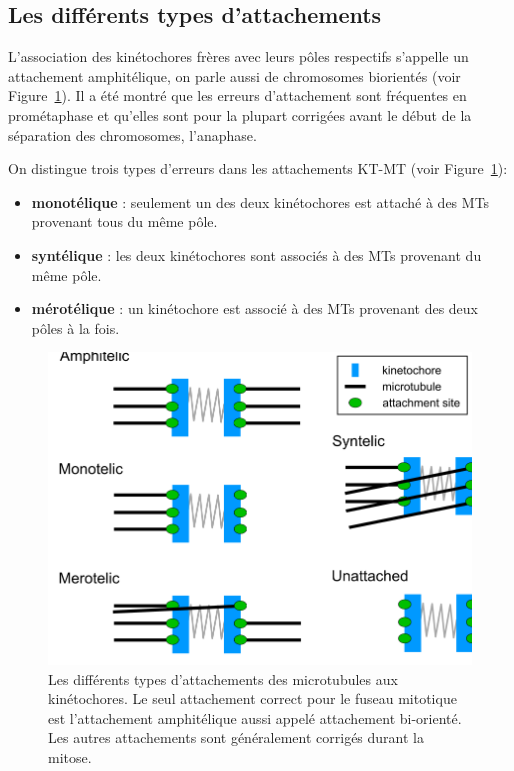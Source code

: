 \documentclass[12pt,a4paper,twoside,openright]{book}
\begin{document}
\subsection{Les différents types
d'attachements}\label{sec:attachments-type}

L'association des kinétochores frères avec leurs pôles respectifs
s'appelle un attachement amphitélique, on parle aussi de chromosomes
biorientés (voir Figure~\ref{fig:attachements}). Il a été montré que les
erreurs d'attachement sont fréquentes en prométaphase et qu'elles sont
pour la plupart corrigées avant le début de la séparation des
chromosomes, l'anaphase.

On distingue trois types d'erreurs dans les attachements KT-MT (voir
Figure~\ref{fig:attachements}):

\begin{itemize}
\item
  \textbf{monotélique} : seulement un des deux kinétochores est attaché
  à des MTs provenant tous du même pôle.
\item
  \textbf{syntélique} : les deux kinétochores sont associés à des MTs
  provenant du même pôle.
\item
  \textbf{mérotélique} : un kinétochore est associé à des MTs provenant
  des deux pôles à la fois.
\end{itemize}

\begin{figure}[htbp]
\centering
\includegraphics{figures/intro/attachments.png}
\caption[Les différents types d'attachements des microtubules aux kinétochores]{\label{fig:attachements}Les
différents types d'attachements des microtubules aux kinétochores. Le
seul attachement correct pour le fuseau mitotique est l'attachement
amphitélique aussi appelé attachement bi-orienté. Les autres
attachements sont généralement corrigés durant la mitose.}
\end{figure}
\end{document}
